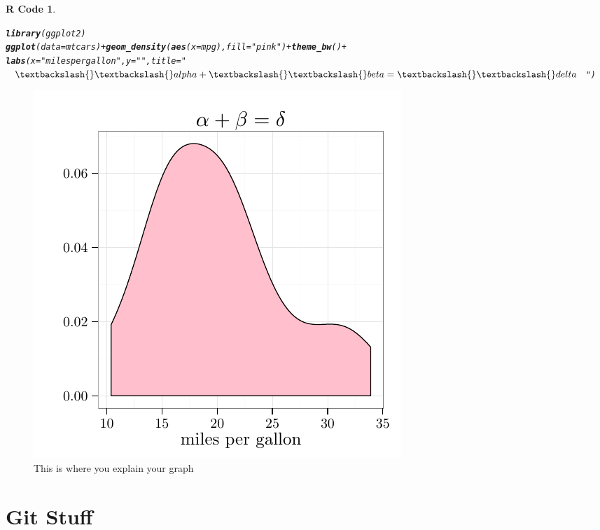 \documentclass{article}\usepackage[]{graphicx}\usepackage[]{color}
\makeatletter
\newcommand{\hlstr}[1]{\textcolor[rgb]{0.192,0.494,0.8}{#1}}%
\newcommand{\hlopt}[1]{\textcolor[rgb]{0,0,0}{#1}}%
\newcommand{\hlstd}[1]{\textcolor[rgb]{0.345,0.345,0.345}{#1}}%
\newcommand{\hlkwc}[1]{\textcolor[rgb]{0.333,0.667,0.333}{#1}}%
\newcommand{\hlkwd}[1]{\textcolor[rgb]{0.737,0.353,0.396}{\textbf{#1}}}%
\newenvironment{kframe}{%
 \def\at@end@of@kframe{}%
 \ifinner\ifhmode%
  \def\at@end@of@kframe{\end{minipage}}%
  \begin{minipage}{\columnwidth}%
 \fi\fi%
 \def\FrameCommand##1{\hskip\@totalleftmargin \hskip-\fboxsep
 \colorbox{shadecolor}{##1}\hskip-\fboxsep
     \hskip-\linewidth \hskip-\@totalleftmargin \hskip\columnwidth}%
 \MakeFramed {\advance\hsize-\width
   \@totalleftmargin\z@ \linewidth\hsize
   \@setminipage}}%
 {\par\unskip\endMakeFramed%
 \at@end@of@kframe}
\newenvironment{knitrout}{}{} %
\theoremstyle{rcode}
\newtheorem{rcode}{R Code}[section]
\makeatother
\begin{document}
\begin{knitrout}
\color{fgcolor}\begin{kframe}
\begin{rcode}\label{Graph}\hfill{}\begin{alltt}
\hlkwd{library}\hlstd{(ggplot2)}
\hlkwd{ggplot}\hlstd{(}\hlkwc{data} \hlstd{= mtcars)} \hlopt{+} \hlkwd{geom_density}\hlstd{(}\hlkwd{aes}\hlstd{(}\hlkwc{x} \hlstd{= mpg),} \hlkwc{fill} \hlstd{=} \hlstr{"pink"}\hlstd{)} \hlopt{+} \hlkwd{theme_bw}\hlstd{()} \hlopt{+}
    \hlkwd{labs}\hlstd{(}\hlkwc{x} \hlstd{=} \hlstr{"miles per gallon"}\hlstd{,} \hlkwc{y} \hlstd{=} \hlstr{""}\hlstd{,} \hlkwc{title} \hlstd{=} \hlstr{"$\textbackslash{}\textbackslash{}alpha + \textbackslash{}\textbackslash{}beta = \textbackslash{}\textbackslash{}delta$"}\hlstd{)}
\end{alltt}
\end{rcode}\end{kframe}
\end{knitrout}


\begin{figure}[h]
\begin{knitrout}
\color{fgcolor}

{\centering \includegraphics[width=.5\textwidth]{figure/GraphShow} 

}



\end{knitrout}

\caption{This is where you explain your graph \label{graphDude}}
\end{figure}

\clearpage

\section{Git Stuff}
\end{document}
